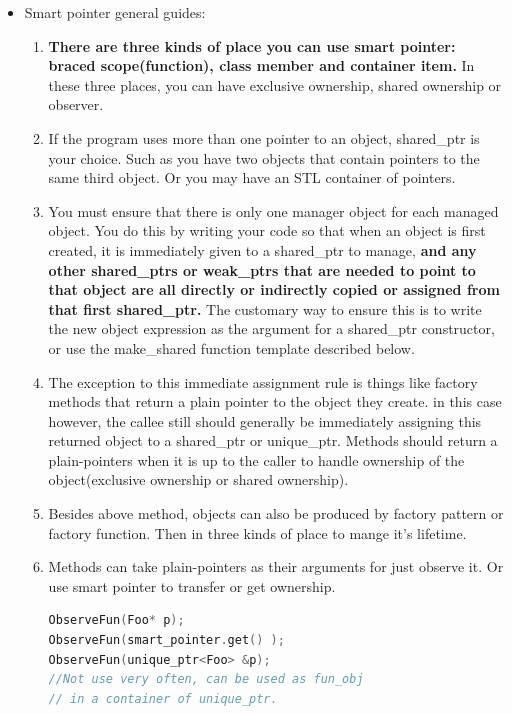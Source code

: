 \documentclass[a4paper,12pt,twoside]{book}
\begin{document}
\begin{itemize}

\item Smart pointer general guides:

\begin{enumerate}
\item \textbf{There are three kinds of place you can use smart pointer: braced scope(function), class member and container item.} In these three places, you can have exclusive ownership, shared ownership or observer.  

\item If the program uses more than one pointer to an object, shared\_ptr is your choice.  Such as you have two objects that contain pointers to the same third object. Or you may have an STL container of pointers.

\item You must ensure that there is only one manager object for each managed object. You do this by writing your code so that when an object is first created, it is immediately given to a shared\_ptr to manage, \textbf{and any other shared\_ptrs or weak\_ptrs that are needed to point to that object are all directly or indirectly copied or assigned from that first shared\_ptr.} The customary way to ensure this is to write the new object expression as the argument for a shared\_ptr constructor, or use the make\_shared function template described below.

\item The exception to this immediate assignment rule is things like factory methods that return a plain pointer to the object they create. in this case however, the callee still should generally be immediately assigning this returned object to a shared\_ptr or unique\_ptr.  Methods should return a plain-pointers when it is up to the caller to handle ownership of the object(exclusive ownership or shared ownership).

\item Besides above method, objects can also be produced by factory pattern or factory function. Then in three kinds of place to mange it's lifetime. 

\item Methods can take plain-pointers as their arguments for just observe it. Or use smart pointer to transfer or get ownership.
\begin{lstlisting}[frame=single, language=c++]
ObserveFun(Foo* p);
ObserveFun(smart_pointer.get() );
ObserveFun(unique_ptr<Foo> &p);
//Not use very often, can be used as fun_obj
// in a container of unique_ptr.


\end{lstlisting}
\end{enumerate}
\end{itemize}
\end{document}
